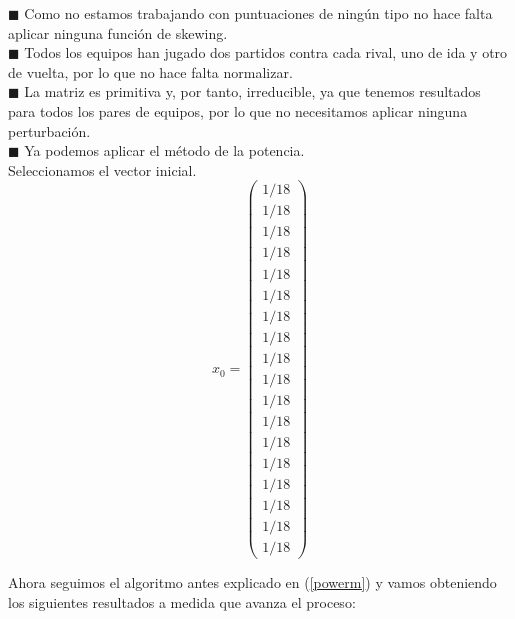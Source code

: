 	$\blacksquare $ Como no estamos trabajando con puntuaciones de ningún tipo no hace falta aplicar ninguna función de skewing.\\
	
	$\blacksquare $ Todos los equipos han jugado dos partidos contra cada rival, uno de ida y otro de vuelta, por lo que no hace falta normalizar.\\ 
	
	$\blacksquare $ La matriz es primitiva y, por tanto, irreducible, ya que tenemos resultados para todos los pares de equipos, por lo que no necesitamos aplicar ninguna perturbación.\\
	
	$\blacksquare $ Ya podemos aplicar el método de la potencia.\\
	
	
	Seleccionamos el vector inicial.
	\begin{equation*}
	x_{0} = 
	\left( \begin{array}{c}
	1/18\\
	1/18\\
	1/18\\
	1/18\\
	1/18\\
	1/18\\
	1/18\\
	1/18\\
	1/18\\
	1/18\\
	1/18\\
	1/18\\
	1/18\\
	1/18\\
	1/18\\
	1/18\\
	1/18\\
	1/18
	\end{array}\right) 
	\end{equation*}
	
	\newpage
	
	Ahora seguimos el algoritmo antes explicado en (\ref{powerm}) y vamos obteniendo los siguientes resultados a medida que avanza el proceso:
	

